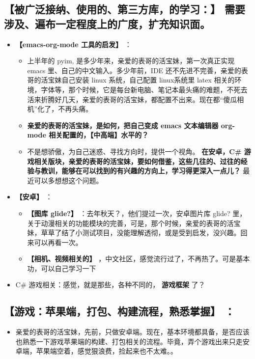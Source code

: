 \documentclass[9pt, b5paper]{article}
\begin{document}
\subsection{\textbf{【被广泛接纳、使用的、第三方库，的学习：】} 需要涉及、遍布一定程度上的广度，扩充知识面。}
\label{sec-1-6}
\begin{itemize}
\item \textbf{【emacs-org-mode 工具的启发】} ：
\begin{itemize}
\item 上半年的 pyim, 是多少年来，亲爱的表哥的活宝妹，第一次真正实现 emacs 里、自己的中文输入。多少年前，IDE 还不先进不完善，亲爱的表哥的活宝妹自己安装 linux 系统，自己配置 linux系统里 latex 相关的环境，字体等，那个时候，它是每台新电脑、笔记本最头痛的难题，不死去活来折腾好几天，亲爱的表哥的活宝妹，都配置不出来。现在都“傻瓜相机”化了，不再头痛。
\item \textbf{亲爱的表哥的活宝妹，是如何，把自己变成 emacs 文本编辑器 org-mode 相关配置的，【中高端】水平的？}
\item 不是想骄傲，为自己迷惑、寻找方向时，提供一个视角。 \textbf{在安卓，C\# 游戏相关版块，亲爱的表哥的活宝妹，要如何借鉴，这些几往的、过往的经验与教训，能够在可以找到的有兴趣的方向上，学习得更深入一点儿？} 最近可以多想想这个问题。
\end{itemize}
\item \textbf{【安卓】} ：
\begin{itemize}
\item \textbf{【图库 glide?】} ：去年秋天？，他们提过一次，安卓图片库 glide? 里，关于动漫相关的功能模块的完善，可是，那个时候，亲爱的表哥的活宝妹，草草了结了小测试项目，没能理解透彻，或是受到启发，没兴趣。回来可以再看一次。
\item \textbf{【相机、视频相关的】} ，中文社区，感觉流行过了，不再热了。可是基本功，可以自己学习一下
\end{itemize}
\item C\# 游戏相关：感觉，就是那些，各种不同的， \textbf{游戏框架} 了？
\end{itemize}
\subsection{\textbf{【游戏：苹果端，打包、构建流程，熟悉掌握】} ：}
\label{sec-1-7}
\begin{itemize}
\item 亲爱的表哥的活宝妹，先前，只做安卓端。现在，基本环境都具备，是否应该也熟悉一下游戏苹果端的构建、打包相关的流程。毕竟，弄个游戏出来只走安卓端，苹果端空着，感觉狠浪费，捡起来也不太难。。
\end{itemize}
\end{document}
